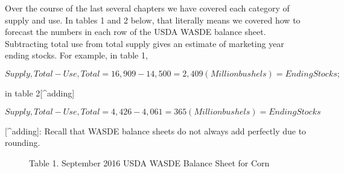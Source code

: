 \documentclass[
  letterpaper,
  DIV=11,
  numbers=noendperiod]{scrreprt}
\begin{document}
Over the course of the last several chapters we have covered each
category of supply and use. In tables 1 and 2 below, that literally
means we covered how to forecast the numbers in each row of the USDA
WASDE balance sheet. Subtracting total use from total supply gives an
estimate of marketing year ending stocks. For example, in table 1,

\[Supply, Total - Use, Total = 16,909 - 14,500 = 2,409 (Million bushels) = Ending Stocks;\]

in table 2{[}\^{}adding{]}

\[Supply, Total - Use, Total = 4,426 - 4,061 = 365 (Million bushels) = Ending Stocks\]

\begin{description}
\item[{[}\^{}adding{]}: Recall that WASDE balance sheets do not always
add perfectly due to rounding.]
Table 1. September 2016 USDA WASDE Balance Sheet for Corn
\end{description}
\end{document}
